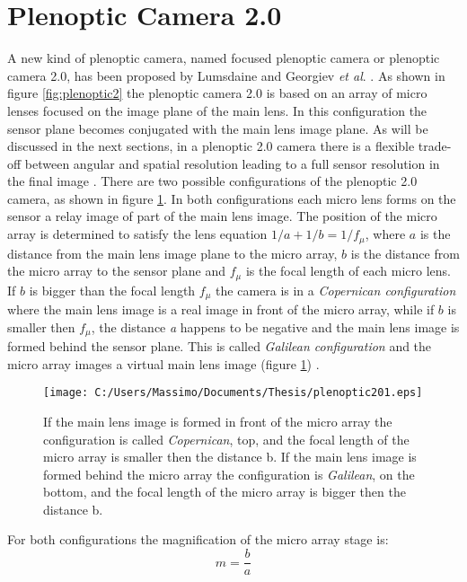  \section{Plenoptic Camera 2.0}
 \label{sec:pleno20}
 A new kind of plenoptic camera, named focused plenoptic camera or plenoptic camera 2.0, has been proposed by Lumsdaine and Georgiev \textit{et al}. \cite{lumsdaine2008full,lumsdaine2009focused}. As shown in figure \ref{fig:plenoptic2} the plenoptic camera 2.0 is based on an array of micro lenses focused on the image plane of the main lens. In this configuration the sensor plane becomes conjugated with the main lens image plane. As will be discussed in the next sections, in a plenoptic 2.0 camera there is a flexible trade-off between angular and spatial resolution \cite{georgiev2010focused} leading to a full sensor resolution in the final image \cite{bishop2011full,georgiev2009resolution}. There are two possible configurations of the plenoptic 2.0 camera, as shown in figure \ref{fig:pleno201}. In both configurations each micro lens forms on the sensor a relay image of part of the main lens image. The position of the micro array is determined to satisfy the lens equation $1/a+1/b=1/f_{\mu}$, where $a$ is the distance from the main lens image plane to the micro array, $b$ is the distance from the micro array to the sensor plane and $f_{\mu}$ is the focal length of each micro lens. If $b$ is bigger than the focal length $f_{\mu}$ the camera is in a \textit{Copernican configuration} where the main lens image is a real image in front of the micro array, while if $b$ is smaller then $f_{\mu}$, the distance \textit{a} happens to be negative and the main lens image is formed behind the sensor plane. This is called \textit{Galilean configuration} and the micro array images a virtual main lens image (figure \ref{fig:pleno201}) \cite{georgiev2010focused}. 
 \begin{figure}[H]
 	\centering
 	\texttt{[image: C:/Users/Massimo/Documents/Thesis/plenoptic201.eps]}
 	\caption{\label{fig:pleno201} If the main lens image is formed in front of the micro array the configuration is called \textit{Copernican}, top, and the focal length of the micro array is smaller then the distance b. If the main lens image is formed behind the micro array the configuration is \textit{Galilean}, on the bottom, and the focal length of the micro array is bigger then the distance b. }
 \end{figure}
 For both configurations the magnification of the micro array stage is:
 \begin{equation}
 \label{eq:pleno20}
 m=\dfrac{b}{a}
 \end{equation}
